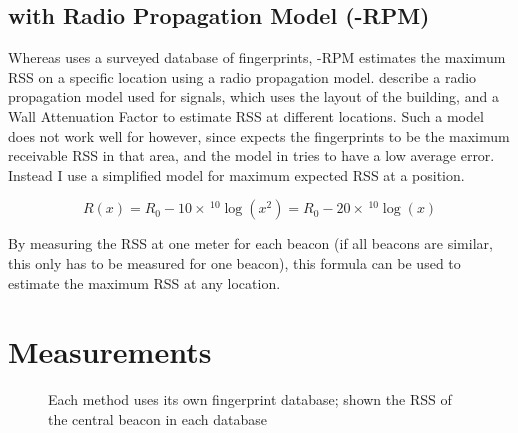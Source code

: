 \subsection{\BRP with Radio Propagation Model (\aBRP-RPM)}
Whereas \aBRP uses a surveyed database of fingerprints, \aBRP-RPM estimates the maximum RSS on a specific location using a radio propagation model.
\citet{bahl2000radar} describe a radio propagation model used for \wifi signals, which uses the layout of the building, and a Wall Attenuation Factor to estimate RSS at different locations.
Such a model does not work well for \aBRP however, since \aBRP expects the fingerprints to be the maximum receivable RSS in that area, and the model in \citet{bahl2000radar} tries to have a low average error.
Instead I use a simplified model for maximum expected RSS at a position.

\begin{equation}
    R(x) = R_0 - 10 \times \, ^{10}\log(x^2) = R_0 - 20 \times \, ^{10}\log(x)
\end{equation}

By measuring the RSS at one meter for each beacon (if all beacons are similar, this only has to be measured for one beacon), this formula can be used to estimate the maximum RSS at any location.

\section{Measurements}
\label{sec:architecture-measurements}
\begin{figure}[p]
    \begin{subfigure}[b]{0.5\textwidth}
    \end{subfigure}
    \begin{subfigure}[b]{0.5\textwidth}
    \end{subfigure}
    \begin{subfigure}[b]{0.5\textwidth}
    \end{subfigure}
    \begin{subfigure}[b]{0.5\textwidth}
    \end{subfigure}
    \caption{Each method uses its own fingerprint database; shown the RSS of the central beacon in each database}
    \label{fig:architecture-heatmaps}
\end{figure}

